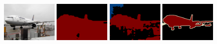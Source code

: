 \begin{figure}[t]
  \centering

  \vspace{-0.5em}
 
  \hspace{4em}
  \hspace{4em}
  \hspace{2em}
  \vspace{-0.05em} 
  \vspace{-0.05em} 
  {\includegraphics[width=0.24\textwidth]{figures/experiments/pascal/0000.jpg}}
  {\includegraphics[width=0.24\textwidth]{figures/experiments/pascal/orgckpt/0000.png}}
  {\includegraphics[width=0.24\textwidth]{figures/experiments/pascal/ft/0000.png}}
  {\includegraphics[width=0.24\textwidth]{figures/experiments/pascal/gt/2007_000033.png}}
  

\end{figure}
